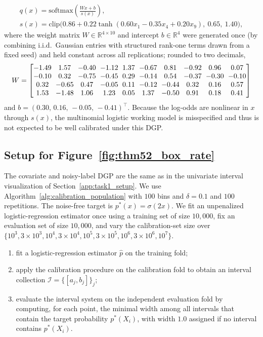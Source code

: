 \documentclass[11pt]{article}
\theoremstyle{statplain}
\theoremstyle{statdefinition}
\newcommand{\0}{\mathbf{0}}
\begin{document}
\begin{gather*}
q(x) = \mathrm{softmax}\!\left(\frac{W x + b}{s(x)}\right),
\\
s(x) = \mathrm{clip}\big(0.86 + 0.22\tanh(0.60 x_1 - 0.35 x_4 + 0.20 x_9),\ 0.65,\ 1.40\big),
\end{gather*}
where the weight matrix $W \in \mathbb{R}^{4 \times 10}$ and intercept $b \in \mathbb{R}^4$ were generated once (by combining i.i.d.\ Gaussian entries with structured rank-one terms drawn from a fixed seed) and held constant across all replications; rounded to two decimals,
{\small
\[
\setlength{\arraycolsep}{3pt}
W =
\begin{bmatrix}
-1.49 & 1.57 & -0.40 & -1.12 & 1.37 & -0.67 & 0.81 & -0.92 & 0.96 & 0.07 \\
-0.10 & 0.32 & -0.75 & -0.45 & 0.29 & -0.14 & 0.54 & -0.37 & -0.30 & -0.10 \\
0.32 & -0.65 & 0.47 & -0.05 & 0.11 & -0.12 & -0.44 & 0.32 & 0.16 & 0.57 \\
1.53 & -1.48 & 1.06 & 1.23 & 0.05 & 1.37 & -0.50 & 0.91 & 0.18 & 0.41
\end{bmatrix}
\]
}%
and $b = (0.30,\, 0.16,\, -0.05,\, -0.41)^\top$.
Because the log-odds are nonlinear in $x$ through $s(x)$, the multinomial logistic working model is misspecified and thus is not expected to be well calibrated under this DGP.


\subsection{Setup for Figure~\ref{fig:thm52_box_rate}}

\label{app:verification-consistency-prediction-setup}

The covariate and noisy-label DGP are the same as in the univariate interval visualization of Section~\ref{app:task1_setup}. We use Algorithm~\ref{alg:calibration_population} with \(100\) bins and \(\delta=0.1\) and \(100\) repetitions.
The noise-free target is $p^*(x)=\sigma(2x)$. We fit an unpenalized logistic-regression estimator once using a training set of size $10,000$, fix an evaluation set of size $10,000$, and vary the calibration-set size over $\{10^3,3\times10^3,10^4,3\times10^4,10^5,3\times10^5,10^6,3\times10^6,10^7\}$. 
\begin{enumerate}
\item fit a logistic-regression estimator \(\hat p\) on the training fold;
\item apply the calibration procedure on the calibration fold to obtain an interval collection \(\mathcal I=\{[a_j,b_j]\}_j\);
\item evaluate the interval system on the independent evaluation fold by computing, for each point, the minimal width among all intervals that contain the target probability \(p^*(X_i)\), with width \(1.0\) assigned if no interval contains \(p^*(X_i)\).
\end{enumerate}
\end{document}

